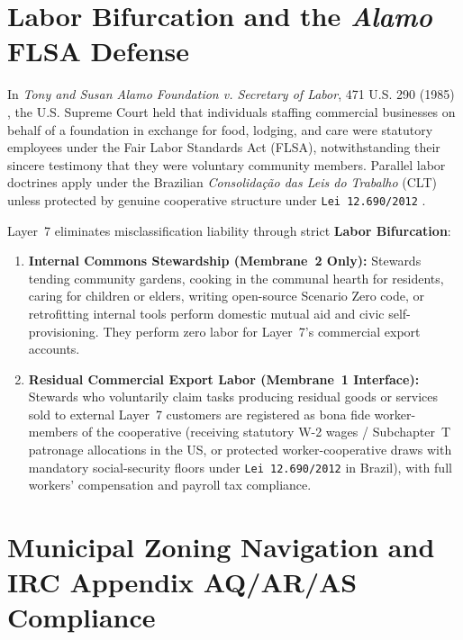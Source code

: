 \section{Labor Bifurcation and the \textit{Alamo} FLSA Defense}
\label{sec:l7-alamo-labor-bifurcation}

In \textit{Tony and Susan Alamo Foundation v. Secretary of Labor}, 471 U.S. 290 (1985) \parencite{alamo1985}, the U.S. Supreme Court held that individuals staffing commercial businesses on behalf of a foundation in exchange for food, lodging, and care were statutory employees under the Fair Labor Standards Act (FLSA), notwithstanding their sincere testimony that they were voluntary community members. Parallel labor doctrines apply under the Brazilian \textit{Consolida{\c{c}}{\~a}o das Leis do Trabalho} (CLT) unless protected by genuine cooperative structure under \texttt{Lei 12.690/2012} \parencite{brazil_lei12690}.

Layer~7 eliminates misclassification liability through strict \textbf{Labor Bifurcation}:
\begin{enumerate}
    \item \textbf{Internal Commons Stewardship (Membrane~2 Only):} Stewards tending community gardens, cooking in the communal hearth for residents, caring for children or elders, writing open-source Scenario Zero code, or retrofitting internal tools perform domestic mutual aid and civic self-provisioning. They perform zero labor for Layer~7's commercial export accounts.
    \item \textbf{Residual Commercial Export Labor (Membrane~1 Interface):} Stewards who voluntarily claim tasks producing residual goods or services sold to external Layer~7 customers are registered as bona fide worker-members of the cooperative (receiving statutory W-2 wages / Subchapter~T patronage allocations in the US, or protected worker-cooperative draws with mandatory social-security floors under \texttt{Lei 12.690/2012} in Brazil), with full workers' compensation and payroll tax compliance.
\end{enumerate}

\section{Municipal Zoning Navigation and IRC Appendix AQ/AR/AS Compliance}
\label{sec:l7-municipal-zoning}

